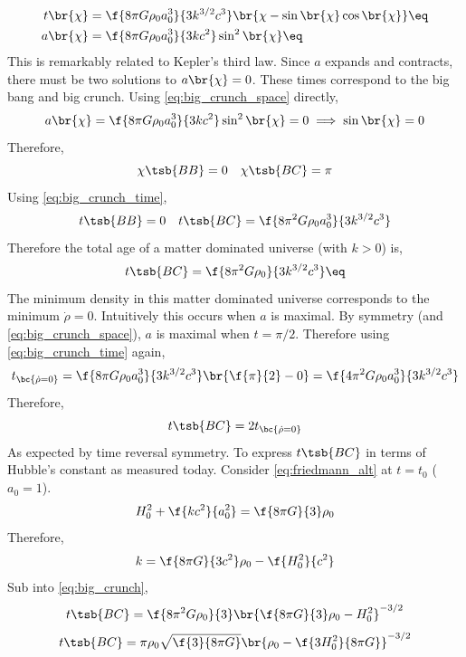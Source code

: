\documentclass{article}
\begin{document}
\begin{align*}
t\br{\chi} &= \f{8 \pi G\rho_0a_0^3}{3k^{3/2}c^3}\br{\chi - \sin\br{\chi}\cos\br{\chi}} \eq \label{eq:big_crunch_time} \\
a\br{\chi} &= \f{8 \pi G\rho_0a_0^3}{3kc^2} \sin^2\br{\chi}  \eq \label{eq:big_crunch_space}
\end{align*}
This is remarkably related to Kepler's third law. Since $a$ expands and contracts, there must be two solutions to $a\br{\chi} = 0$. These times correspond to the big bang and big crunch. Using \cref{eq:big_crunch_space} directly,
\[ a\br{\chi} = \f{8 \pi G\rho_0a_0^3}{3kc^2} \sin^2\br{\chi} = 0 \implies \sin\br{\chi} = 0 \]
Therefore,
\[ \chi\tsb{BB} = 0 \quad \chi\tsb{BC} = \pi \]
Using \cref{eq:big_crunch_time},
\[ t\tsb{BB} = 0 \quad t\tsb{BC} = \f{8 \pi^2 G\rho_0a_0^3}{3k^{3/2}c^3} \]
Therefore the total age of a matter dominated universe (with $k >0$) is,
\[ t\tsb{BC} = \f{8 \pi^2 G\rho_0}{3k^{3/2}c^3} \eq \label{eq:big_crunch}\]
The minimum density in this matter dominated universe corresponds to the minimum $\dot \rho = 0$. Intuitively this occurs when $a$ is maximal. By symmetry (and \cref{eq:big_crunch_space}), $a$ is maximal when $t = \pi /2$. Therefore using \cref{eq:big_crunch_time} again,
\[ t_{\bc{\dot \rho = 0}} = \f{8 \pi G\rho_0a_0^3}{3k^{3/2}c^3}\br{\f{\pi}{2} - 0} = \f{4 \pi^2 G\rho_0a_0^3}{3k^{3/2}c^3} \]
Therefore,
\[ t\tsb{BC} = 2 t_{\bc{\dot \rho = 0}} \]
As expected by time reversal symmetry. To express $t\tsb{BC}$ in terms of Hubble's constant as measured today. Consider \cref{eq:friedmann_alt} at $t= t_0$ ($a_0 = 1$).
\[ H_0^2 + \f{kc^2}{a_0^2} = \f{8 \pi G}{3}\rho_0 \]
Therefore,
\[ k = \f{8 \pi G}{3c^2}\rho_0 - \f{H_0^2}{c^2} \]
Sub into \cref{eq:big_crunch},
\[ t\tsb{BC} = \f{8 \pi^2 G\rho_0}{3}\br{\f{8 \pi G}{3}\rho_0 - H_0^2}^{-3/2}\]
\[ t\tsb{BC} = \pi \rho_0\sqrt{\f{3}{8 \pi G}}\br{\rho_0 - \f{3H_0^2}{8 \pi G}}^{-3/2}\]
\end{document}
